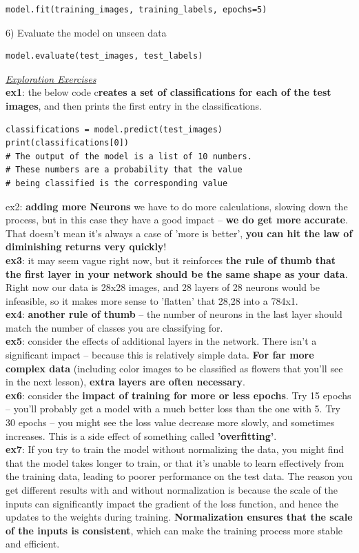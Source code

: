 \documentclass[20pt]{article}
\begin{document}
\begin{itemize}
\begin{verbatim}
model.fit(training_images, training_labels, epochs=5)
		\end{verbatim}
		6) Evaluate the model on unseen data
		\begin{verbatim}
model.evaluate(test_images, test_labels)
		\end{verbatim}
		\textit{\underline{Exploration Exercises}}\\
		\textbf{ex1}: the below code c\textbf{reates a set of classifications for each of the test images}, and then prints the first entry in the classifications.
		\begin{verbatim}
classifications = model.predict(test_images)
print(classifications[0])
# The output of the model is a list of 10 numbers.
# These numbers are a probability that the value
# being classified is the corresponding value
		\end{verbatim}
		ex2\textbf{}: \textbf{adding more Neurons} we have to do more calculations, slowing down the process, but in this case they have a good impact -- \textbf{we do get more accurate}. That doesn't mean it's always a case of 'more is better', \textbf{you can hit the law of diminishing returns very quickly}!\\
		\textbf{ex3}: it may seem vague right now, but it reinforces \textbf{the rule of thumb that the first layer in your network should be the same shape as your data}. Right now our data is 28x28 images, and 28 layers of 28 neurons would be infeasible, so it makes more sense to 'flatten' that 28,28 into a 784x1.\\
		\textbf{ex4}: \textbf{another rule of thumb} -- the number of neurons in the last layer should match the number of classes you are classifying for.\\
		\textbf{ex5}: consider the effects of additional layers in the network. There isn't a significant impact -- because this is relatively simple data. \textbf{For far more complex data} (including color images to be classified as flowers that you'll see in the next lesson),\textbf{ extra layers are often necessary}.\\
		\textbf{ex6}: consider the \textbf{impact of training for more or less epochs}. Try 15 epochs -- you'll probably get a model with a much better loss than the one with 5. Try 30 epochs -- you might see the loss value decrease more slowly, and sometimes increases. This is a side effect of something called \textbf{'overfitting'}.\\
		\textbf{ex7}: If you try to train the model without normalizing the data, you might find that the model takes longer to train, or that it's unable to learn effectively from the training data, leading to poorer performance on the test data. The reason you get different results with and without normalization is because the scale of the inputs can significantly impact the gradient of the loss function, and hence the updates to the weights during training. \textbf{Normalization ensures that the scale of the inputs is consistent}, which can make the training process more stable and efficient.

\end{itemize}
\end{document}
